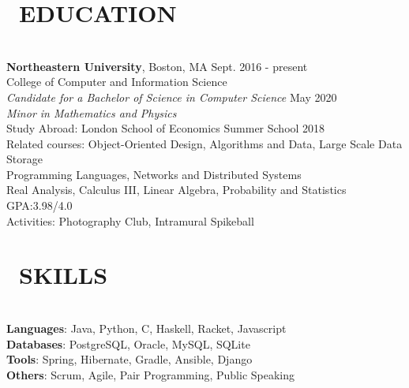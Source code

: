 \documentclass[11pt]{res}
\newcommand{\sectionunderline}{\vspace{-3mm}\hrulefill\\}
\newcommand{\listingtab}{\tabto{3.5cm}}
\newcommand{\newsect}[1]{\section{\Large \bf #1}}
\newcommand{\email}[1]{\faEnvelope\hspace{1mm} \href{mailto:#1}{#1}}
\newcommand{\phone}[1]{\faMobilePhone\hspace{1mm} #1}
\newcommand{\github}[1]{\faGithubSquare\hspace{1mm} \href{https://github.com/#1}{#1}}
\newcommand{\linkedin}[1]{\faLinkedinSquare\hspace{1mm} \href{https://linkedin.com/in/#1}{#1}}
\begin{document}
\address{
  \small\phone{(802) 503-5089}\:
  \large{$\bullet$}
  \small\email{derekpham67@gmail.com}\:
  \large{$\bullet$}
  \small\github{derekpham}\:
  \large{$\bullet$}
  \small\linkedin{derek-pham97}\\
  \small Available: January - August 2019
}

\begin{resume}
  \newsect{\faGraduationCap\ EDUCATION}{
    \sectionunderline{
      {\bf \large Northeastern University}, Boston, MA \hfill Sept. 2016 - present\\
      College of Computer and Information Science}\\
                     {\it Candidate for a Bachelor of Science in Computer Science} \hfill May 2020\\
                     {\it Minor in Mathematics and Physics}\vspace{2mm}\\
                     Study Abroad: \listingtab London School of Economics Summer School \hfill 2018\\
                     Related courses:
                     \listingtab Object-Oriented Design, Algorithms and Data, Large Scale Data Storage\\
                     \listingtab Programming Languages, Networks and Distributed Systems\\
                     \listingtab Real Analysis, Calculus III, Linear Algebra, Probability and Statistics\\
                     GPA:\listingtab 3.98/4.0\\
                     Activities: \listingtab Photography Club, Intramural Spikeball
  }

  \newsect{\faCogs\ SKILLS}{
    \sectionunderline{
      {\bf Languages}: \listingtab Java, Python, C, Haskell, Racket, Javascript\\
      {\bf Databases}: \listingtab PostgreSQL, Oracle, MySQL, SQLite\\
      {\bf Tools}: \listingtab Spring, Hibernate, Gradle, Ansible, Django\\
      {\bf Others}: \listingtab Scrum, Agile, Pair Programming, Public Speaking
    }
  }


\end{resume}
\end{document}
